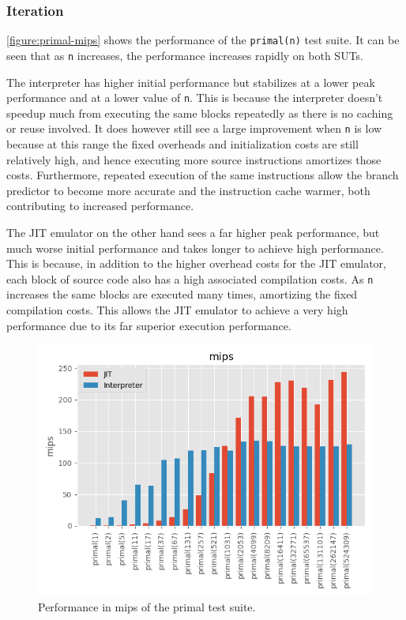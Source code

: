 \subsubsection{Iteration}

\autoref{figure:primal-mips} shows the performance of the \texttt{primal(n)} test suite. It can be seen that as \texttt{n} increases, the performance increases rapidly on both SUTs.

The interpreter has higher initial performance but stabilizes at a lower peak performance and at a lower value of \texttt{n}. This is because the interpreter doesn't speedup much from executing the same blocks repeatedly as there is no caching or reuse involved. It does however still see a large improvement when \texttt{n} is low because at this range the fixed overheads and initialization costs are still relatively high, and hence executing more source instructions amortizes those costs. Furthermore, repeated execution of the same instructions allow the branch predictor to become more accurate and the instruction cache warmer, both contributing to increased performance.

The JIT emulator on the other hand sees a far higher peak performance, but much worse initial performance and takes longer to achieve high performance. This is because, in addition to the higher overhead costs for the JIT emulator, each block of source code also has a high associated compilation costs. As \texttt{n} increases the same blocks are executed many times, amortizing the fixed compilation costs. This allows the JIT emulator to achieve a very high performance due to its far superior execution performance.

\begin{figure}
    \centering
    \includegraphics{output/graphs/tests/primal/mips.png}
    \caption{Performance in mips of the primal test suite.}
    \label{figure:primal-mips}
\end{figure}

